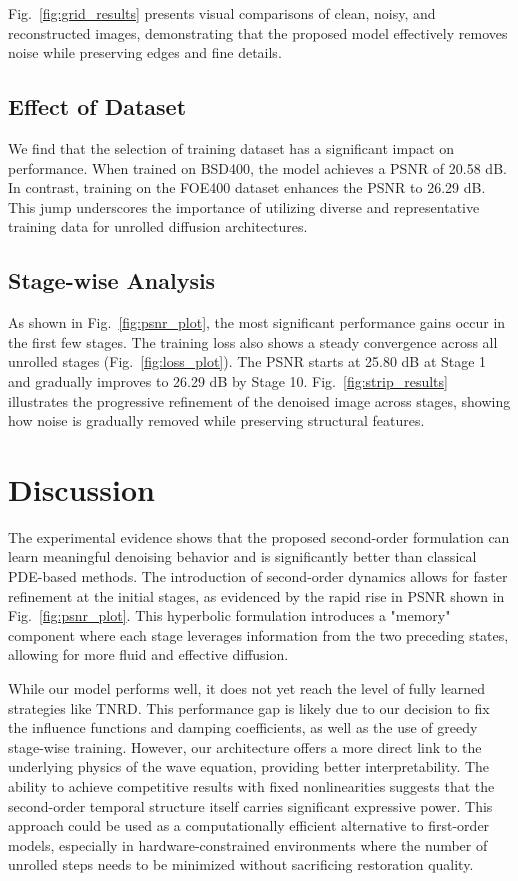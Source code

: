 \documentclass[conference]{IEEEtran}
\begin{document}
Fig.~\ref{fig:grid_results} presents visual comparisons of clean, noisy, and reconstructed images, demonstrating that the proposed model effectively removes noise while preserving edges and fine details.

\subsection{Effect of Dataset}

We find that the selection of training dataset has a significant impact on performance. When trained on BSD400, the model achieves a PSNR of 20.58 dB. In contrast, training on the FOE400 dataset enhances the PSNR to 26.29 dB. This jump underscores the importance of utilizing diverse and representative training data for unrolled diffusion architectures.

\subsection{Stage-wise Analysis}

As shown in Fig.~\ref{fig:psnr_plot}, the most significant performance gains occur in the first few stages. The training loss also shows a steady convergence across all unrolled stages (Fig.~\ref{fig:loss_plot}). The PSNR starts at 25.80 dB at Stage 1 and gradually improves to 26.29 dB by Stage 10. Fig.~\ref{fig:strip_results} illustrates the progressive refinement of the denoised image across stages, showing how noise is gradually removed while preserving structural features.

\section{Discussion}

The experimental evidence shows that the proposed second-order formulation can learn meaningful denoising behavior and is significantly better than classical PDE-based methods. The introduction of second-order dynamics allows for faster refinement at the initial stages, as evidenced by the rapid rise in PSNR shown in Fig.~\ref{fig:psnr_plot}. This hyperbolic formulation introduces a "memory" component where each stage leverages information from the two preceding states, allowing for more fluid and effective diffusion.

While our model performs well, it does not yet reach the level of fully learned strategies like TNRD. This performance gap is likely due to our decision to fix the influence functions and damping coefficients, as well as the use of greedy stage-wise training. However, our architecture offers a more direct link to the underlying physics of the wave equation, providing better interpretability. The ability to achieve competitive results with fixed nonlinearities suggests that the second-order temporal structure itself carries significant expressive power. This approach could be used as a computationally efficient alternative to first-order models, especially in hardware-constrained environments where the number of unrolled steps needs to be minimized without sacrificing restoration quality.



\end{document}
